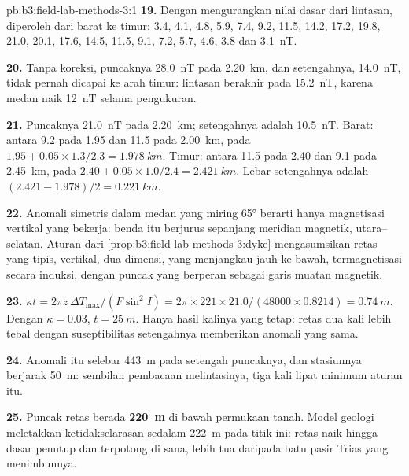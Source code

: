 \begin{solution}{pb:b3:field-lab-methods-3:1}
\textbf{19.} Dengan mengurangkan nilai dasar dari lintasan, diperoleh dari barat ke timur:
3.4, 4.1, 4.8, 5.9, 7.4, 9.2, 11.5, 14.2, 17.2, 19.8, 21.0, 20.1, 17.6,
14.5, 11.5, 9.1, 7.2, 5.7, 4.6, 3.8 dan \qty{3.1}{nT}.

\textbf{20.} Tanpa koreksi, puncaknya \qty{28.0}{nT} pada \qty{2.20}{km}, dan
setengahnya, \qty{14.0}{nT}, tidak pernah dicapai ke arah timur: lintasan berakhir
pada \qty{15.2}{nT}, karena medan naik \qty{12}{nT} selama
pengukuran.

\textbf{21.} Puncaknya \qty{21.0}{nT} pada \qty{2.20}{km}; setengahnya adalah
\qty{10.5}{nT}. Barat: antara \num{9.2} pada \num{1.95} dan \num{11.5} pada
\qty{2.00}{km}, pada $1.95 + 0.05\times1.3/2.3 = \qty{1.978}{km}$. Timur:
antara \num{11.5} pada \num{2.40} dan \num{9.1} pada \qty{2.45}{km}, pada
$2.40 + 0.05\times1.0/2.4 = \qty{2.421}{km}$. Lebar setengahnya adalah $(2.421
- 1.978)/2 = \qty{0.221}{km}$.

\textbf{22.} Anomali simetris dalam medan yang miring \ang{65} berarti hanya
magnetisasi vertikal yang bekerja: benda itu berjurus sepanjang meridian magnetik,
utara--selatan. Aturan dari
\cref{prop:b3:field-lab-methods-3:dyke} mengasumsikan retas yang tipis, vertikal,
dua dimensi, yang menjangkau jauh ke bawah, termagnetisasi secara induksi, dengan puncak
yang berperan sebagai garis muatan magnetik.

\textbf{23.} $\kappa t = 2\pi z\,\Delta T_\mathrm{max}/(F\sin^2 I) = 2\pi\times
221\times21.0/(48000\times0.8214) = \qty{0.74}{m}$. Dengan $\kappa =
0.03$, $t = \qty{25}{m}$. Hanya hasil kalinya yang tetap: retas dua kali
lebih tebal dengan suseptibilitas setengahnya memberikan anomali yang sama.

\textbf{24.} Anomali itu selebar \qty{443}{m} pada setengah puncaknya, dan stasiunnya
berjarak \qty{50}{m}: sembilan pembacaan melintasinya, tiga kali lipat
minimum aturan itu.

\textbf{25.} Puncak retas berada
\textbf{\qty[text-series-to-math=true]{220}{m}} di bawah permukaan tanah. Model
geologi meletakkan ketidakselarasan sedalam \qty{222}{m} pada titik ini:
retas naik hingga dasar penutup dan terpotong di sana, lebih tua
daripada batu pasir Trias yang menimbunnya.
\end{solution}
